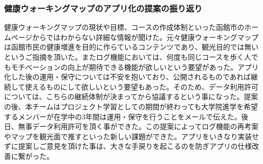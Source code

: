 ﻿\subsubsection{健康ウォーキングマップのアプリ化の提案の振り返り}
健康ウォーキングマップの現状や目標、コースの作成体制といった函館市のホームページからではわからない詳細な情報が聞けた。元々健康ウォーキングマップは函館市民の健康増進を目的に作らているコンテンツであり、観光目的では無いというご指摘を頂いた。またログ機能においては、何度も同じコースを歩く人でもモチベーションの向上が期待できる機能が欲しいという要望があった。アプリ化した後の運用・保守については不安を抱いており、公開されるものであれば継続して使えるものにして欲しいという要望もあった。そのため、データ利用許可については、こちらの継続体制が決まってから協議するという事になった。提案の後、本チームはプロジェクト学習としての期間が終わっても大学院進学を希望するメンバーが在学中の3年間は運用・保守を行うことをメールで伝えた。後日、無事データ利用許可を頂く事ができた。この提案によってログ機能の再考案やマップを観光面で推すといった新しい課題ができた。アプリをいきなり実装せずに提案しご意見を頂けた事は、大きな手戻りを起こるのを防ぎアプリの仕様改善に繋がった。

